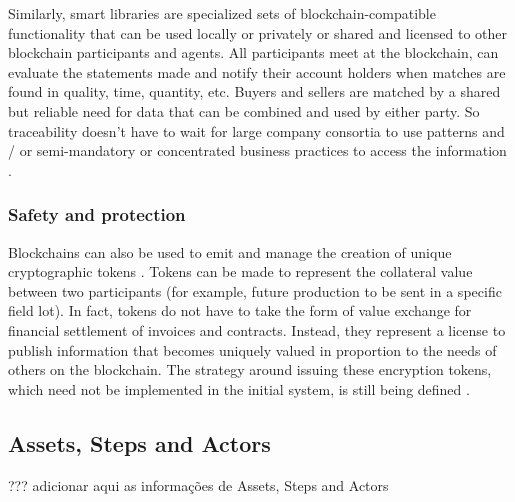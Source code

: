 Similarly, smart libraries are specialized sets of blockchain-compatible functionality that can be used locally or privately or shared and licensed to other blockchain participants and agents. All participants meet at the blockchain, can evaluate the statements made and notify their account holders when matches are found in quality, time, quantity, etc. Buyers and sellers are matched by a shared but reliable need for data that can be combined and used by either party. So traceability doesn't have to wait for large company consortia to use patterns and / or semi-mandatory or concentrated business practices to access the information \cite{galvez2018future}.

\subsubsection{Safety and protection}\label{sec:Safety}
Blockchains can also be used to emit and manage the creation of unique cryptographic tokens \cite{nystrom1999pkcs}. Tokens can be made to represent the collateral value between two participants (for example, future production to be sent in a specific field lot). In fact, tokens do not have to take the form of value exchange for financial settlement of invoices and contracts. Instead, they represent a license to publish information that becomes uniquely valued in proportion to the needs of others on the blockchain. The strategy around issuing these encryption tokens, which need not be implemented in the initial system, is still being defined \cite{galvez2018future}.

\subsection{Assets, Steps and Actors}\label{sec:Safety}
{\color{red} ??? adicionar aqui as informações de Assets, Steps and Actors}
